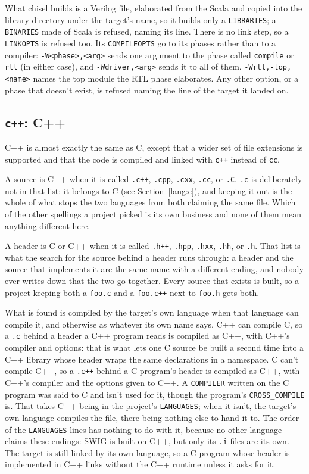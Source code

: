 \documentclass{article}
\begin{document}
What chisel builds is a Verilog file, elaborated from the Scala and
copied into the library directory under the target's name, so it
builds only a \texttt{LIBRARIES}; a \texttt{BINARIES} made of Scala
is refused, naming its line.  There is no link step, so a
\texttt{LINKOPTS} is refused too.  Its \texttt{COMPILEOPTS} go to its
phases rather than to a compiler: \texttt{-W<phase>,<arg>} sends one
argument to the phase called \texttt{compile} or \texttt{rtl} (in
either case), and \texttt{-Wdriver,<arg>} sends it to all of them.
\texttt{-Wrtl,-top,<name>} names the top module the RTL phase
elaborates.  Any other option, or a phase that doesn't exist, is
refused naming the line of the target it landed on.

\subsection{\texttt{c++}: C++ \label{lang:cxx}}

C++ is almost exactly the same as C, except that a wider set of file
extensions is supported and that the code is compiled and linked with
\texttt{c++} instead of \texttt{cc}.

A source is C++ when it is called \texttt{.c++}, \texttt{.cpp},
\texttt{.cxx}, \texttt{.cc}, or \texttt{.C}.  \texttt{.c} is
deliberately not in that list: it belongs to C (see
Section~\ref{lang:c}), and keeping it out is the whole of what stops
the two languages from both claiming the same file.  Which of the
other spellings a project picked is its own business and none of them
mean anything different here.

A header is C or C++ when it is called \texttt{.h++}, \texttt{.hpp},
\texttt{.hxx}, \texttt{.hh}, or \texttt{.h}.  That list is what the
search for the source behind a header runs through: a header and the
source that implements it are the same name with a different ending,
and nobody ever writes down that the two go together.  Every source
that exists is built, so a project keeping both a \texttt{foo.c} and a
\texttt{foo.c++} next to \texttt{foo.h} gets both.

What is found is compiled by the target's own language when that
language can compile it, and otherwise as whatever its own name says.
C++ can compile C, so a \texttt{.c} behind a header a C++ program
reads is compiled as C++, with C++'s compiler and options: that is
what lets one C source be built a second time into a C++ library
whose header wraps the same declarations in a namespace.  C can't
compile C++, so a \texttt{.c++} behind a C program's header is
compiled as C++, with C++'s compiler and the options given to C++.
A \texttt{COMPILER} written on the C program was said to C and isn't
used for it, though the program's \texttt{CROSS\_COMPILE} is.
That takes C++ being in the project's \texttt{LANGUAGES}; when it
isn't, the target's own language compiles the file, there being
nothing else to hand it to.  The order of
the \texttt{LANGUAGES} lines has nothing to do with it, because no
other language claims these endings: SWIG is built on C++, but only
its \texttt{.i} files are its own.  The target is
still linked by its own language, so a C program whose header is
implemented in C++ links without the C++ runtime unless it asks for
it.
\end{document}
